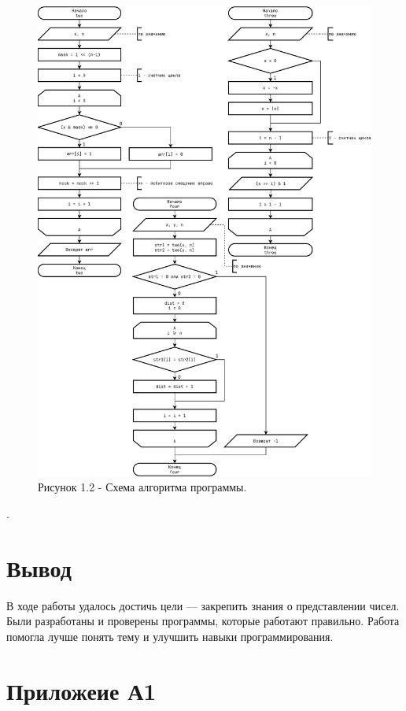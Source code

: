 \documentclass[oneside,a4paper,14pt]{extarticle}
\begin{document}
\begin{figure}[h!]
    \centering
    \includegraphics[height=0.8\textheight]{pics/flowchart_p2.png} 
	\caption*{Рисунок 1.2 - Схема алгоритма программы.}
\end{figure}.\\

\section*{Вывод}
В ходе работы удалось достичь цели --- закрепить знания о представлении чисел.
Были разработаны и проверены программы, которые работают правильно. Работа
помогла лучше понять тему и улучшить навыки программирования.

\section*{Приложеие А1}
\end{document}
